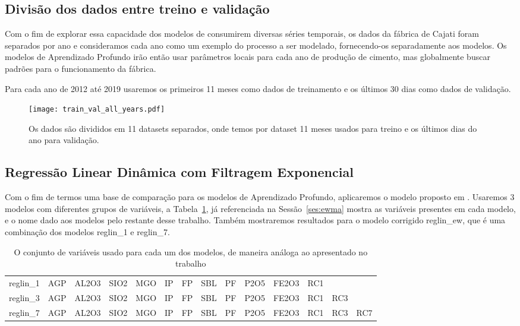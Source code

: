 \subsection{Divisão dos dados entre treino e validação}

Com o fim de explorar essa capacidade dos modelos de consumirem diversas séries
temporais, os dados da fábrica de Cajati foram separados por ano e consideramos
cada ano como um exemplo do processo a ser modelado, fornecendo-os separadamente
aos modelos. Os modelos de Aprendizado
Profundo irão então usar parâmetros locais para cada ano de produção de cimento,
mas globalmente buscar padrões para o funcionamento da fábrica. 

Para cada ano de 2012 até 2019 usaremos os primeiros 11 meses como dados de
treinamento e os últimos 30 dias como dados de validação.


\begin{figure}[H]
  \centering
  \texttt{[image: train\_val\_all\_years.pdf]} 
  \caption{Os dados são divididos em 11 datasets separados, onde temos por
    dataset 11 meses usados para treino e os últimos dias do ano para validação.} 
  \label{fig:trainvalallyears}
\end{figure}

\subsection{Regressão Linear Dinâmica com Filtragem Exponencial}

Com o fim de termos uma base de comparação para os modelos de
Aprendizado Profundo, aplicaremos o modelo proposto em \citep{grecialin}.
Usaremos 3 modelos com diferentes grupos de variáveis, a
Tabela~\ref{tab:modelslin}, já referenciada na Sessão~\ref{ses:ewma} mostra
as variáveis presentes em cada modelo, e o nome dado aos modelos pelo restante
desse trabalho. Também mostraremos resultados para o modelo corrigido
reglin\_ew, que é uma combinação dos modelos reglin\_1 e reglin\_7.


\begin{table}[]
\centering 
\begin{tabular}{llllllllllllll}
\toprule
reglin\_1 &  AGP &  AL2O3 &  SIO2 &  MGO &  IP &  FP &  SBL &  PF &  P2O5 &  FE2O3 &  RC1 &      &      \\
reglin\_3 &  AGP &  AL2O3 &  SIO2 &  MGO &  IP &  FP &  SBL &  PF &  P2O5 &  FE2O3 &  RC1 &  RC3 &      \\
reglin\_7 &  AGP &  AL2O3 &  SIO2 &  MGO &  IP &  FP &  SBL &  PF &  P2O5 &  FE2O3 &  RC1 &  RC3 &  RC7 \\
\bottomrule
\end{tabular}
\caption{O conjunto de variáveis usado para cada um dos modelos, de maneira análoga ao apresentado no trabalho \cite{grecialin}}
\label{tab:modelslin}
\end{table}


